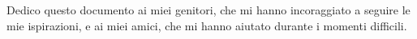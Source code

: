 
\cleardoublepage
{}
\thispagestyle{empty}

\vspace*{3cm}

\begin{center}
Dedico questo documento ai miei genitori, che mi hanno incoraggiato a seguire le mie ispirazioni, e ai miei amici, che mi hanno aiutato durante i momenti difficili.
\end{center}
